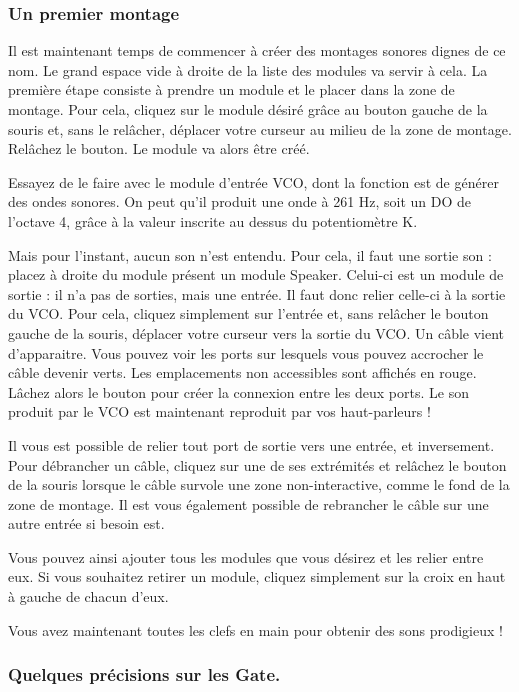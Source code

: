 \documentclass[a4paper,oneside,frenchb,12pt]{article}
\begin{document}
\subsubsection{Un premier montage}

Il est maintenant temps de commencer à créer des montages sonores dignes
de ce nom. Le grand espace vide à droite de la liste des modules va
servir à cela. La première étape consiste à prendre un module et le
placer dans la zone de montage. Pour cela, cliquez sur le module désiré
grâce au bouton gauche de la souris et, sans le relâcher, déplacer votre
curseur au milieu de la zone de montage. Relâchez le bouton. Le module
va alors être créé.

Essayez de le faire avec le module d'entrée VCO, dont la fonction est de
générer des ondes sonores. On peut qu'il produit une onde à 261 Hz, soit
un DO de l'octave 4, grâce à la valeur inscrite au dessus du
potentiomètre K.

Mais pour l'instant, aucun son n'est entendu. Pour cela, il faut une
sortie son : placez à droite du module présent un module Speaker.
Celui-ci est un module de sortie : il n'a pas de sorties, mais une
entrée. Il faut donc relier celle-ci à la sortie du VCO. Pour cela,
cliquez simplement sur l'entrée et, sans relâcher le bouton gauche de la
souris, déplacer votre curseur vers la sortie du VCO. Un câble vient
d'apparaitre. Vous pouvez voir les ports sur lesquels vous pouvez
accrocher le câble devenir verts. Les emplacements non accessibles sont
affichés en rouge. Lâchez alors le bouton pour créer la connexion entre
les deux ports. Le son produit par le VCO est maintenant reproduit par
vos haut-parleurs !

Il vous est possible de relier tout port de sortie vers une entrée, et
inversement. Pour débrancher un câble, cliquez sur une de ses extrémités
et relâchez le bouton de la souris lorsque le câble survole une zone
non-interactive, comme le fond de la zone de montage. Il est vous
également possible de rebrancher le câble sur une autre entrée si besoin
est.

Vous pouvez ainsi ajouter tous les modules que vous désirez et les
relier entre eux. Si vous souhaitez retirer un module, cliquez
simplement sur la croix en haut à gauche de chacun d'eux.

Vous avez maintenant toutes les clefs en main pour obtenir des sons
prodigieux !

\subsubsection{Quelques précisions sur les Gate.}
\end{document}
